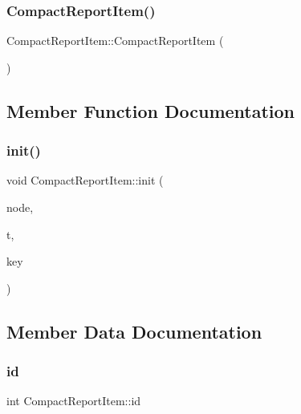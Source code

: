 \subsubsection{\texorpdfstring{Compact\+Report\+Item()}{CompactReportItem()}}
{\footnotesize\ttfamily Compact\+Report\+Item\+::\+Compact\+Report\+Item (\begin{DoxyParamCaption}{ }\end{DoxyParamCaption})\hspace{0.3cm}{\ttfamily [inline]}}



\subsection{Member Function Documentation}
\mbox{\label{classCompactReportItem_a0504a6f22fd588f4030c0b5386afc5c5}} 
\subsubsection{\texorpdfstring{init()}{init()}}
{\footnotesize\ttfamily void Compact\+Report\+Item\+::init (\begin{DoxyParamCaption}\item[{void $\ast$}]{node,  }\item[{\hyperlink{reportitem_8h_ae4f179a72db5cca021a37ec4c6fe4c68}{Report\+Type}}]{t,  }\item[{int}]{key }\end{DoxyParamCaption})\hspace{0.3cm}{\ttfamily [inline]}}



\subsection{Member Data Documentation}
\mbox{\label{classCompactReportItem_a77f72e05167dd5b5b275fcaf1c413d0b}} 
\subsubsection{\texorpdfstring{id}{id}}
{\footnotesize\ttfamily int Compact\+Report\+Item\+::id}

